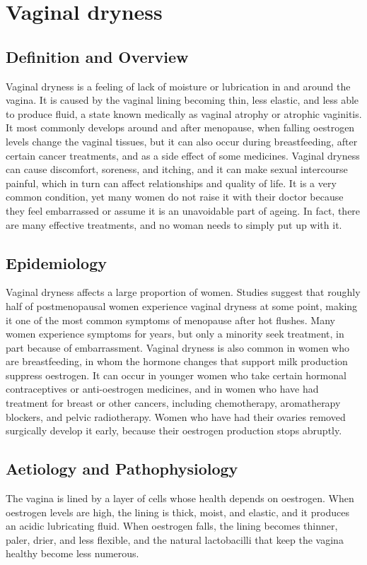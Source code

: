 \chapter{Vaginal dryness}

\section*{Definition and Overview}
Vaginal dryness is a feeling of lack of moisture or lubrication in and around the vagina. It is caused by the vaginal lining becoming thin, less elastic, and less able to produce fluid, a state known medically as vaginal atrophy or atrophic vaginitis. It most commonly develops around and after menopause, when falling oestrogen levels change the vaginal tissues, but it can also occur during breastfeeding, after certain cancer treatments, and as a side effect of some medicines. Vaginal dryness can cause discomfort, soreness, and itching, and it can make sexual intercourse painful, which in turn can affect relationships and quality of life. It is a very common condition, yet many women do not raise it with their doctor because they feel embarrassed or assume it is an unavoidable part of ageing. In fact, there are many effective treatments, and no woman needs to simply put up with it.

\section*{Epidemiology}
Vaginal dryness affects a large proportion of women. Studies suggest that roughly half of postmenopausal women experience vaginal dryness at some point, making it one of the most common symptoms of menopause after hot flushes. Many women experience symptoms for years, but only a minority seek treatment, in part because of embarrassment. Vaginal dryness is also common in women who are breastfeeding, in whom the hormone changes that support milk production suppress oestrogen. It can occur in younger women who take certain hormonal contraceptives or anti-oestrogen medicines, and in women who have had treatment for breast or other cancers, including chemotherapy, aromatherapy blockers, and pelvic radiotherapy. Women who have had their ovaries removed surgically develop it early, because their oestrogen production stops abruptly.

\section*{Aetiology and Pathophysiology}
The vagina is lined by a layer of cells whose health depends on oestrogen. When oestrogen levels are high, the lining is thick, moist, and elastic, and it produces an acidic lubricating fluid. When oestrogen falls, the lining becomes thinner, paler, drier, and less flexible, and the natural lactobacilli that keep the vagina healthy become less numerous.

